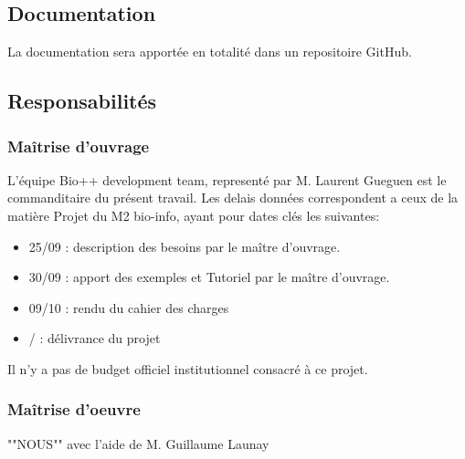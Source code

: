 \subsection{Documentation} 
La documentation sera apportée en totalité dans un repositoire GitHub.

	
\subsection{Responsabilités}
\subsubsection{Maîtrise d'ouvrage}
L'équipe Bio++ development team, representé par M. Laurent Gueguen est le commanditaire du présent travail. Les delais données correspondent a ceux de la matière Projet du M2 bio-info, ayant pour dates clés les suivantes:
\begin{itemize}
	\item 25/09 : description des besoins par le maître d'ouvrage.
	\item 30/09 : apport des exemples et Tutoriel par le maître d'ouvrage.
	\item 09/10 : rendu du cahier des charges 
	\item / : délivrance du projet 
\end{itemize}
Il n'y a pas de budget officiel institutionnel consacré à ce projet. 

\subsubsection{Maîtrise d'oeuvre}
""NOUS"" avec l'aide de M. Guillaume Launay

%
